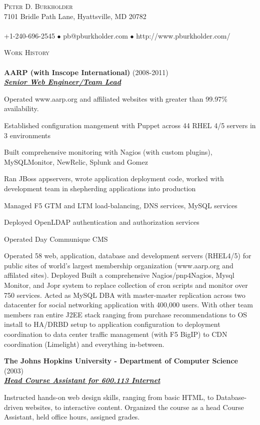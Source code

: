 \documentclass{article}
\newcommand{\lineunder}{\vspace*{-8pt} \\ \hspace*{-18pt} \hrulefill \\}
\newcommand{\header}[1]{{\hspace*{-15pt}\vspace*{6pt} \textsc{#1}} \vspace*{-6pt} \lineunder}
\newcommand{\employer}[3]{{ \textbf{#1} (#2)\\ \underline{\textbf{\emph{#3}}}\\  }}
\newcommand{\contact}[3]{
    \vspace*{-8pt}
    \begin{center}
        {\LARGE \scshape {#1}}\\
        #2 \lineunder 
        #3
    \end{center}
    \vspace*{-8pt}
}
\newenvironment{achievements}{\begin{list}{\topsep 0pt \itemsep -2pt}} {\vspace*{4pt}\end{list}}
\begin{document}
\small
\smallskip
\vspace*{-44pt}

\contact{Peter D. Burkholder}
{7101 Bridle Path Lane, Hyattsville, MD 20782}
{+1-240-696-2545 $\bullet$ pb@pburkholder.com  $\bullet$ http://www.pburkholder.com/}

\header{Work History}
\employer{AARP (with Inscope International)}{2008-2011}{Senior Web Engineer/Team Lead}
	\begin{achievements}
    \item Operated www.aarp.org and affiliated websites with greater than 99.97\% availability.
	\item Established configuration mangement with Puppet across 44 RHEL 4/5 servers in 3 environments
    \item Built comprehensive monitoring with Nagios (with custom plugins), MySQLMonitor, NewRelic, Splunk and Gomez
	\item Ran JBoss appservers, wrote application deployment code, worked with development team in shepherding applications into production 
	\item Managed F5 GTM and LTM load-balancing, DNS services, MySQL services
	\item Deployed OpenLDAP authentication and authorization services
	\item Operated Day Communique CMS 
    
Operated 58 web, application, database and development servers (RHEL4/5) for public sites of world's largest membership organization (www.aarp.org and affilated sites).  Deployed Built a comprehensive Nagios/pnp4Nagios, Mysql Monitor, and Jopr system to replace collection of cron scripts and monitor over 750 services.  
Acted as MySQL DBA with master-master replication across two datacenter for social networking application with 400,000 users. With other team members ran entire J2EE stack ranging from purchase recommendations to OS install to HA/DRBD setup to application configuration to deployment coordination to data center traffic management (with F5 BigIP) to CDN coordination (Limelight) and everything in-between.
	\end{achievements}

\employer{The Johns Hopkins University - Department of Computer Science}{2003}{Head Course Assistant for 600.113 Internet}
	\begin{achievements}
	\item Instructed hands-on web design skills, ranging from basic HTML, to Database-driven websites, to interactive content. Organized the course as a head Course Assistant, held office hours, assigned grades.
	\end{achievements}
\end{document}
